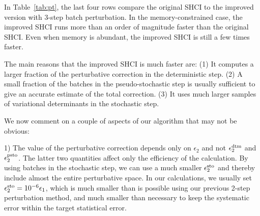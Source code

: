 \documentclass[%
reprint,
 superscriptaddress,
 amsmath,amssymb,
 aps,
]{revtex4-1}
\begin{document}
In Table~\ref{tab:pt}, the last four rows compare the original SHCI to the improved version with 3-step batch perturbation.
In the memory-constrained case, the improved SHCI runs more than an order of magnitude faster than the original SHCI.
Even when memory is abundant, the improved SHCI is still a few times faster.

The main reasons that the improved SHCI is much faster are:
(1) It computes a larger fraction of the perturbative correction in the deterministic step.
(2) A small fraction of the batches in the pseudo-stochastic step is usually sufficient to give an accurate estimate of the total correction.
(3) It uses much larger samples of variational determinants in the stochastic step.

We now comment on a couple of aspects of our algorithm that may not be obvious:

{\color{black}1)
The value of the perturbative correction depends only on $\epsilon_2$ and not $\epsilon_2^{\rm dtm}$ and $\epsilon_2^{\rm psto}$.
The latter two quantities affect only the efficiency of the calculation.
By using batches in the stochastic step, we can use a much smaller $\epsilon_2^{\rm sto}$ and thereby
include almost the entire perturbative space.
In our calculations, we usually set $\epsilon_2^{\rm sto}=10^{-6}\epsilon_1$, which is much smaller
than is possible using our previous 2-step perturbation method, and much smaller than necessary
to keep the systematic error within the target statistical error.
}
\end{document}

